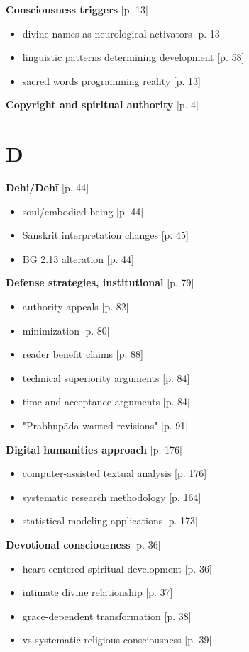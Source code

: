 \documentclass[11pt,twoside]{book}
\begin{document}
\textbf{\textbf{Consciousness triggers}} {[}p. 13]
\begin{itemize}
\item divine names as neurological activators [p. 13]
\item linguistic patterns determining development [p. 58]
\item sacred words programming reality [p. 13]
\end{itemize}

\textbf{\textbf{Copyright and spiritual authority}} {[}p. 4]
\section*{D}
\label{sec:org5e6d7ee}

\textbf{\textbf{Dehi/Dehī}} {[}p. 44]
\begin{itemize}
\item soul/embodied being [p. 44]
\item Sanskrit interpretation changes [p. 45]
\item BG 2.13 alteration [p. 44]
\end{itemize}

\textbf{\textbf{Defense strategies, institutional}} {[}p. 79]
\begin{itemize}
\item authority appeals [p. 82]
\item minimization [p. 80]
\item reader benefit claims [p. 88]
\item technical superiority arguments [p. 84]
\item time and acceptance arguments [p. 84]
\item "Prabhupāda wanted revisions" [p. 91]
\end{itemize}

\textbf{\textbf{Digital humanities approach}} {[}p. 176]
\begin{itemize}
\item computer-assisted textual analysis [p. 176]
\item systematic research methodology [p. 164]
\item statistical modeling applications [p. 173]
\end{itemize}

\textbf{\textbf{Devotional consciousness}} {[}p. 36]
\begin{itemize}
\item heart-centered spiritual development [p. 36]
\item intimate divine relationship [p. 37]
\item grace-dependent transformation [p. 38]
\item vs systematic religious consciousness [p. 39]
\end{itemize}
\end{document}
